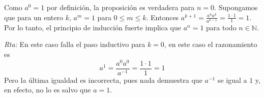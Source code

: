 \documentclass[12pt,spanish,makeidx]{amsbook}
\newcommand{\rta}{\noindent\textit{Rta: }}
\begin{document}
\begin{enumerate}
\begin{enumerate}
			Como $a^0=1$ por definición, la proposición es verdadera para $n=0$. Supongamos
			que para  un entero $k$, $a^m=1$ para $0\leq m \leq k$. Entonces
			$a^{k+1}= \frac{a^k a^k}{a^{k-1}}=\frac{1\cdot1}1=1$.
			Por lo tanto, el principio de inducción fuerte implica que $a^n=1$ para todo $n\in \mathbb N$.
			
			\rta En  este caso falla el paso inductivo para $k=0$,  en este caso el razonamiento es
			\begin{equation*}
				a^{1}= \frac{a^0 a^0}{a^{-1}}=\frac{1\cdot1}1=1
			\end{equation*}
			Pero la última igualdad es incorrecta, pues nada demuestra que $a^{-1}$  se igual a $1$ y, en efecto, no lo es salvo que  $a=1$. 
		\end{enumerate}
		
		
	\end{enumerate}
	
	
\end{document}
